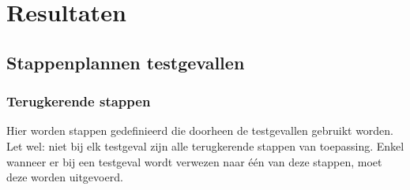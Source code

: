 
\chapter{Resultaten}
\label{ch:resultaten}

\section{Stappenplannen testgevallen}

\subsection{Terugkerende stappen}
\label{recurringsteps}

Hier worden stappen gedefinieerd die doorheen de testgevallen gebruikt worden. Let wel: niet bij elk testgeval zijn alle terugkerende stappen van toepassing. Enkel wanneer er bij een testgeval wordt verwezen naar één van deze stappen, moet deze worden uitgevoerd.

